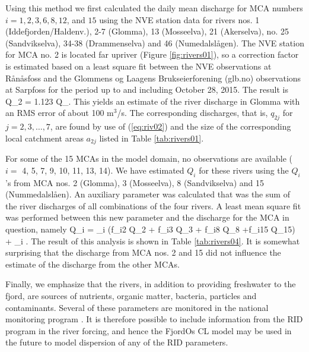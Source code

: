 Using this method we first calculated the daily mean discharge for MCA numbers $i=1, 2, 3, 6, 8, 12$, and $15$ using the NVE station data for rivers nos. 1 (Iddefjorden/Haldenv.), 2-7 (Glomma), 13 (Mosseelva), 21 (Akerselva), no. 25 (Sandvikselva), 34-38 (Drammenselva) and 46 (Numedalsl{\aa}gen). The NVE station for MCA no. 2 is located far upriver (Figure \ref{fig:rivers01}), so a correction factor is estimated based on a least square fit between the NVE observations at R{\aa}n{\aa}sfoss and the Glommens og Laagens Brukseierforening (glb.no) observations at Sarpfoss for the period up to and including October 28, 2015. The result is
\be
 \label{eq:riv04}
 Q_2 = 1.123 \cdot Q_{}.
\ee
This yields an estimate of the river discharge in Glomma with an RMS error of about 100 m$^3$/s. The corresponding discharges, that is, $q_{2j}$ for $j=2,3,\ldots,7$, are found by use of (\ref{eq:riv02}) and the size of the corresponding local catchment areas $a_{2j}$ listed in Table \ref{tab:rivers01}.


For some of the 15 MCAs in the model domain, no observations are available ($i=$ 4, 5, 7, 9, 10, 11, 13, 14). We have estimated $Q_i$ for these rivers using the $Q_i$'s from MCA nos. 2 (Glomma), 3 (Mosseelva), 8 (Sandvikselva) and 15 (Nummedalsl{\aa}en). An auxiliary parameter was calculated that was the sum of the river discharges of all combinations of the four rivers. A least mean square fit was performed between this new parameter and the discharge for the MCA in question, namely 
\be
 \label{eq:riv05}
 Q_i = \alpha_i \left(f_{i2} Q_2 + f_{i3} Q_3 + f_{i8} Q_8 +f_{i15} Q_{15}\right) + \beta_i .
\ee
The result of this analysis is shown in Table \ref{tab:rivers04}. It is somewhat surprising that the discharge from MCA nos. 2 and 15 did not influence the estimate of the discharge from the other MCAs.   


Finally, we emphasize that the rivers, in addition to providing freshwater to the fjord, are sources of nutrients, organic matter, bacteria, particles and contaminants. Several of these parameters are monitored in the national monitoring program \citep[Riverine Inputs and direct Discharges - RID,][]{skarb:etal:2011}. It is therefore possible to include information from the RID program in the river forcing, and hence the FjordOs CL model may be used in the future to model dispersion of any of the RID parameters.





